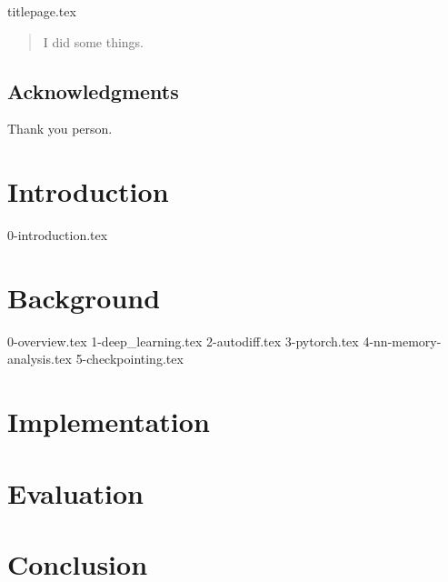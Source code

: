 \documentclass[12pt,twoside]{report}
\begin{document}
{titlepage.tex}

\clearpage{\pagestyle{empty}\cleardoublepage}
\setcounter{page}{1}
\pagestyle{fancy}

\begin{abstract}
I did some things.
\end{abstract}

\cleardoublepage
\section*{Acknowledgments}
Thank you person.

\clearpage{\pagestyle{empty}\cleardoublepage}

\tableofcontents
\clearpage{\pagestyle{empty}}

\listoffigures
\clearpage{\pagestyle{empty}}

\listoflistings

\clearpage{\pagestyle{empty}\cleardoublepage}
\setcounter{page}{1}
\fancyhead[LE,RO]{\slshape \rightmark}
\fancyhead[LO,RE]{\slshape \leftmark}

\chapter{Introduction}
{0-introduction.tex}


\chapter{Background}
{0-overview.tex}
{1-deep_learning.tex}
{2-autodiff.tex}
{3-pytorch.tex}
{4-nn-memory-analysis.tex}
{5-checkpointing.tex}


\chapter{Implementation}


\chapter{Evaluation}


\chapter{Conclusion}



\end{document}
